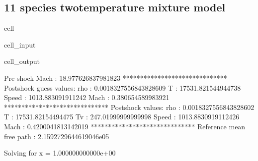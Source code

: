 \documentclass[letterpaper,10pt,english]{jupyterBook}
\begin{document}
\subsection{11 species two\sphinxhyphen{}temperature mixture model}
\label{\detokenize{Results/Results:species-two-temperature-mixture-model}}
\begin{sphinxuseclass}{cell}\begin{sphinxVerbatimInput}

\begin{sphinxuseclass}{cell_input}
\begin{sphinxVerbatim}[commandchars=\\\{\}]
  
\end{sphinxVerbatim}

\end{sphinxuseclass}\end{sphinxVerbatimInput}
\begin{sphinxVerbatimOutput}

\begin{sphinxuseclass}{cell_output}
\begin{sphinxVerbatim}[commandchars=\\\{\}]
Pre shock Mach : 18.977626837981823
******************************
Post\PYGZhy{}shock guess values:
rho    : 0.0018327556843828609
T      : 17531.821544944738
Speed  : 1013.883091911242
Mach   : 0.380654589983921
******************************
Post\PYGZhy{}shock values:
rho    : 0.0018327556843828602
T      : 17531.82154494475
Tv     : 247.01999999999998
Speed  : 1013.8830919112426
Mach   : 0.4200041813142019
******************************
Reference mean free path : 2.1592729644619046e\PYGZhy{}05

Solving for x = 1.000000000000e+00
\end{sphinxVerbatim}

\end{sphinxuseclass}\end{sphinxVerbatimOutput}

\end{sphinxuseclass}
\end{document}
